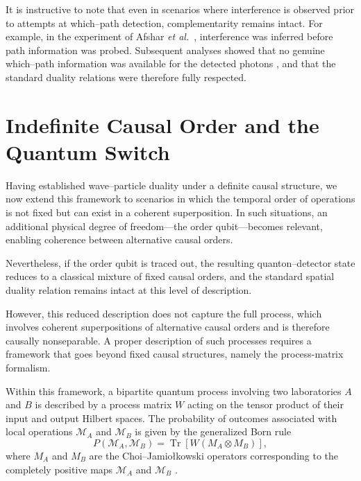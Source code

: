\documentclass[aps,pra,reprint,superscriptaddress]{revtex4-2}
\begin{document}
It is instructive to note that even in scenarios where
interference is observed prior to attempts at which--path
detection, complementarity remains intact. For example,
in the experiment of Afshar \textit{et al.}~\cite{afshar2007},
interference was inferred before path information was probed.
Subsequent analyses showed that no genuine which--path
information was available for the detected photons
\cite{Qureshi_2012,Qureshi2023}, and that the standard
duality relations were therefore fully respected.
\section{Indefinite Causal Order and the Quantum Switch}\label{sec:indef}
Having established wave--particle duality under a definite causal structure, we now extend this framework to scenarios in which the temporal order of operations is not fixed but can exist in a coherent superposition. In such situations, an additional physical degree of freedom—the order qubit—becomes relevant, enabling coherence between alternative causal orders. 

Nevertheless, if the order qubit is traced out, the resulting
quanton--detector state reduces to a classical mixture of
fixed causal orders, and the standard spatial duality relation
remains intact at this level of description. 

However, this reduced description does not capture the full
process, which involves coherent superpositions of alternative
causal orders and is therefore causally nonseparable. A proper
description of such processes requires a framework that goes
beyond fixed causal structures, namely the process-matrix
formalism.

Within this framework, a bipartite quantum process involving
two laboratories $A$ and $B$ is described by a process matrix
$W$ acting on the tensor product of their input and output
Hilbert spaces. The probability of outcomes associated with
local operations $\mathcal{M}_A$ and $\mathcal{M}_B$ is given
by the generalized Born rule
\begin{equation}
P(\mathcal{M}_A,\mathcal{M}_B)
=
\operatorname{Tr}\!\left[W\left(M_A \otimes M_B\right)\right],
\end{equation}
where $M_A$ and $M_B$ are the Choi--Jamiołkowski operators
corresponding to the completely positive maps
$\mathcal{M}_A$ and $\mathcal{M}_B$ \cite{Oreshkov2012}.
\end{document}
